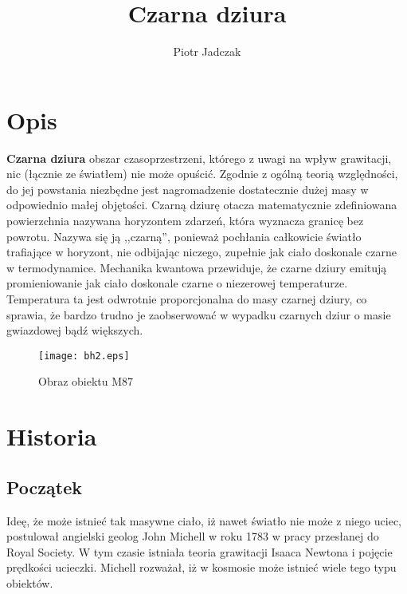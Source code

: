 \documentclass[12pt]{article}
\title{Czarna dziura}
\author{Piotr Jadczak}
\begin{document}
\maketitle
\newpage
\section{Opis}

\textbf{Czarna dziura} \textendash{} obszar czasoprzestrzeni, kt\'{o}rego z uwagi na wp\l{}yw grawitacji, nic (\l{}\k{a}cznie ze \'{s}wiat\l{}em) nie mo\.{z}e opu\'{s}ci\'{c}. Zgodnie z og\'{o}ln\k{a} teori\k{a} wzgl\k{e}dno\'{s}ci, do jej powstania niezb\k{e}dne jest nagromadzenie dostatecznie du\.{z}ej masy w odpowiednio ma\l{}ej obj\k{e}to\'{s}ci. Czarn\k{a} dziur\k{e} otacza matematycznie zdefiniowana powierzchnia nazywana horyzontem zdarze\'{n}, kt\'{o}ra wyznacza granic\k{e} bez powrotu. Nazywa si\k{e} j\k{a} ,,czarn\k{a}\textquotedblright{}, poniewa\.{z} poch\l{}ania ca\l{}kowicie \'{s}wiat\l{}o trafiaj\k{a}ce w horyzont, nie odbijaj\k{a}c niczego, zupe\l{}nie jak cia\l{}o doskonale czarne w termodynamice. Mechanika kwantowa przewiduje, \.{z}e czarne dziury emituj\k{a} promieniowanie jak cia\l{}o doskonale czarne o niezerowej temperaturze. Temperatura ta jest odwrotnie proporcjonalna do masy czarnej dziury, co sprawia, \.{z}e bardzo trudno je zaobserwowa\'{c} w wypadku czarnych dziur o masie gwiazdowej b\k{a}d\'{z} wi\k{e}kszych.

\begin{figure}[ht]
\begin{center}
\texttt{[image: bh2.eps]}
\caption{Obraz obiektu M87}
\end{center}
\end{figure}


\newpage
\section{Historia}
\subsection{Pocz\k{a}tek}
Ide\k{e}, \.{z}e mo\.{z}e istnie\'{c} tak masywne cia\l{}o, i\.{z} nawet \'{s}wiat\l{}o nie mo\.{z}e z niego uciec, postulowa\l{} angielski geolog John Michell w roku 1783 w pracy przes\l{}anej do Royal Society. W tym czasie istnia\l{}a teoria grawitacji Isaaca Newtona i poj\k{e}cie pr\k{e}dko\'{s}ci ucieczki. Michell rozwa\.{z}a\l{}, i\.{z} w kosmosie mo\.{z}e istnie\'{c} wiele tego typu obiekt\'{o}w.
\end{document}
